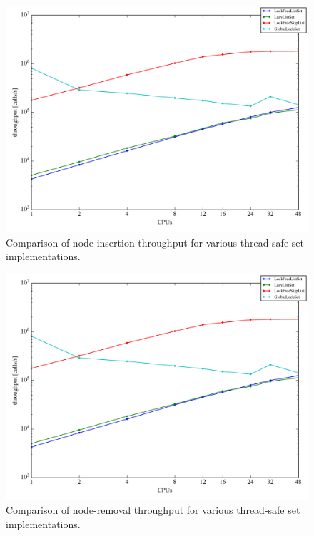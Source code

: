 \documentclass{article}
\begin{document}
\begin{figure}[htb]
  \centering
  \includegraphics[width=0.9\linewidth]{figures/add}
  \caption{Comparison of node-insertion throughput for various thread-safe set implementations.}
  \label{add}
\end{figure}


\begin{figure}[htb]
  \centering
  \includegraphics[width=0.9\linewidth]{figures/remove}
  \caption{Comparison of node-removal throughput for various thread-safe set implementations.}
  \label{remove}
\end{figure}
\end{document}
